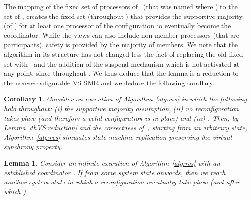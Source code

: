 \documentclass[11pt]{article}
\newtheorem{lemma}[theorem]{Lemma}
\newtheorem{corollary}[theorem]{Corollary}
\newenvironment{proof}{\noindent{\bf Proof.}}{\hfill}
\begin{document}
\begin{proof}
The mapping of the fixed set of processors of~\cite{SSVS} (that was named  where ) to the set of , creates the fixed set (throughout ) that provides the supportive majority (of ) for at least one processor of the configuration to eventually become the coordinator. 
While the views can also include non-member processors (that are participants), safety is provided by the majority of  members.
We note that the algorithm in its structure has not changed less the fact of replacing the old fixed set with , and the addition of the suspend mechanism which is not activated at any point, since  throughout .
We thus deduce that the lemma is a reduction to the non-reconfigurable VS SMR and we deduce the following corollary.
\end{proof}

\begin{corollary}
\label{thVS:redCorollary}
Consider an execution  of Algorithm~\ref{alg:rvs} in which the following hold throughout: (i) the supportive majority assumption, (ii) no reconfiguration takes place (and therefore a valid configuration  is in place) and (iii) . 
Then, by Lemma~\ref{thVS:reduction} and the correctness of~\cite{SSVS},  starting from an arbitrary state, Algorithm~\ref{alg:rvs} simulates state machine replication preserving the virtual synchrony property.
\end{corollary}

\begin{lemma}
\label{thVS:eventReconf} 
\sloppy Consider an infinite execution  of Algorithm~\ref{alg:rvs} with an established coordinator . 
If  from some system state  onwards, then we reach another system state  in which a reconfiguration eventually take place (and after which ). 
\end{lemma}
\end{document}
